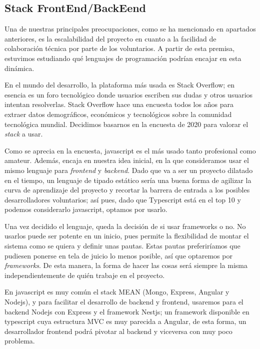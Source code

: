 \subsection{Stack FrontEnd/BackEend}
Una de nuestras principales preocupaciones, como se ha mencionado en apartados anteriores, es la escalabilidad del proyecto en cuanto a la facilidad de colaboración técnica por parte de los voluntarios. A partir de esta premisa, estuvimos estudiando qué lenguajes de programación podrían encajar en esta dinámica.
\par En el mundo del desarrollo, la plataforma más usada es Stack Overflow; en esencia es un foro tecnológico donde usuarios escriben sus dudas y otros usuarios intentan resolverlas. Stack Overflow hace una encuesta todos los años para extraer datos demográficos, económicos y tecnológicos sobre la comunidad tecnológica mundial. Decidimos basarnos en la encuesta de 2020 \citep{techSurveyStackOverflow} para valorar el \emph{stack} a usar.
\par Como se aprecia en la encuesta, javascript es el más usado tanto profesional como amateur. Además, encaja en nuestra idea inicial, en la que consideramos usar el mismo lenguaje para \emph{frontend} y \emph{backend}. Dado que va a ser un proyecto dilatado en el tiempo, un lenguaje de tipado estático sería una buena forma de agilizar la curva de aprendizaje del proyecto y recortar la barrera de entrada a los posibles desarrolladores voluntarios; así pues, dado que Typescript está en el top 10 y podemos considerarlo javascript, optamos por usarlo.
\par Una vez decidido el lenguaje, queda la decisión de si usar frameworks o no. No usarlos puede ser potente en un inicio, pues permite la flexibilidad de montar el sistema como se quiera y definir unas pautas. Estas pautas preferiríamos que pudiesen ponerse en tela de juicio lo menos posible, así que optaremos por \emph{frameworks}. De esta manera, la forma de hacer las cosas será siempre la misma independientemente de quién trabaje en el proyecto.
\par En javascript es muy común el stack MEAN (Mongo, Express, Angular y Nodejs), y para facilitar el desarrollo de backend y frontend, usaremos para el backend Nodejs con Express y el framework Nestjs; un framework disponible en typescript cuya estructura MVC es muy parecida a Angular, de esta forma, un desarrollador frontend podrá pivotar al backend y viceversa con muy poco problema.
